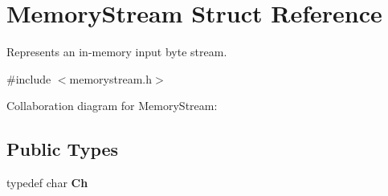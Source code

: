 \hypertarget{struct_memory_stream}{}\section{Memory\+Stream Struct Reference}
\label{struct_memory_stream}


Represents an in-\/memory input byte stream.  




{\ttfamily \#include $<$memorystream.\+h$>$}



Collaboration diagram for Memory\+Stream\+:
\subsection*{Public Types}
\begin{DoxyCompactItemize}
\item 
\mbox{\label{struct_memory_stream_a62a1cbd052c325c83dbdb387d2f89088}} 
typedef char {\bfseries Ch}
\end{DoxyCompactItemize}
